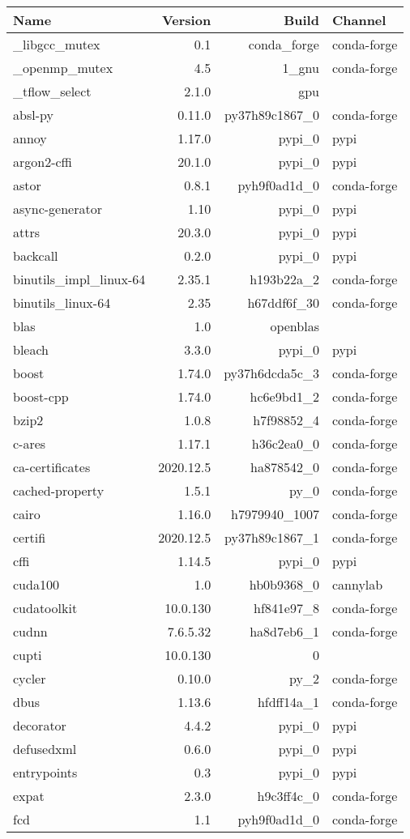 \begin{table}[h]
	\begin{center}
		\begin{tabular}{|l|r|r|l|}
			 \textbf{Name} &\textbf{Version} &\textbf{Build} &\textbf{Channel} \\
			 \hline
			\_libgcc\_mutex &0.1 & conda\_forge &conda-forge \\
			\_openmp\_mutex &4.5 & 1\_gnu &conda-forge \\
			\_tflow\_select &2.1.0 & gpu & \\
			absl-py &0.11.0 & py37h89c1867\_0 &conda-forge \\
			annoy &1.17.0 & pypi\_0 &pypi \\
			argon2-cffi &20.1.0 & pypi\_0 &pypi \\
			astor &0.8.1 & pyh9f0ad1d\_0 &conda-forge \\
			async-generator &1.10 & pypi\_0 &pypi \\
			attrs &20.3.0 & pypi\_0 &pypi \\
			backcall &0.2.0 & pypi\_0 &pypi \\
			binutils\_impl\_linux-64 &2.35.1 & h193b22a\_2 &conda-forge \\
			binutils\_linux-64 &2.35 & h67ddf6f\_30 &conda-forge \\
			blas &1.0 & openblas & \\
			bleach &3.3.0 & pypi\_0 &pypi \\
			boost &1.74.0 & py37h6dcda5c\_3 &conda-forge \\
			boost-cpp &1.74.0 & hc6e9bd1\_2 &conda-forge \\
			bzip2 &1.0.8 & h7f98852\_4 &conda-forge \\
			c-ares &1.17.1 & h36c2ea0\_0 &conda-forge \\
			ca-certificates &2020.12.5 & ha878542\_0 &conda-forge \\
			cached-property &1.5.1 & py\_0 &conda-forge \\
			cairo &1.16.0 & h7979940\_1007 &conda-forge \\
			certifi &2020.12.5 & py37h89c1867\_1 &conda-forge \\
			cffi &1.14.5 & pypi\_0 &pypi \\
			cuda100 &1.0 & hb0b9368\_0 &cannylab \\
			cudatoolkit &10.0.130 & hf841e97\_8 &conda-forge \\
			cudnn &7.6.5.32 & ha8d7eb6\_1 &conda-forge \\
			cupti &10.0.130 & 0 & \\
			cycler &0.10.0 & py\_2 &conda-forge \\	
			dbus &1.13.6 & hfdff14a\_1 &conda-forge \\
			decorator &4.4.2 & pypi\_0 &pypi \\
			defusedxml &0.6.0 & pypi\_0 &pypi \\
			entrypoints &0.3 & pypi\_0 &pypi \\
			expat &2.3.0 & h9c3ff4c\_0 &conda-forge \\
			fcd &1.1 & pyh9f0ad1d\_0 &conda-forge \\
			


\end{tabular}
\end{center}
\end{table}
